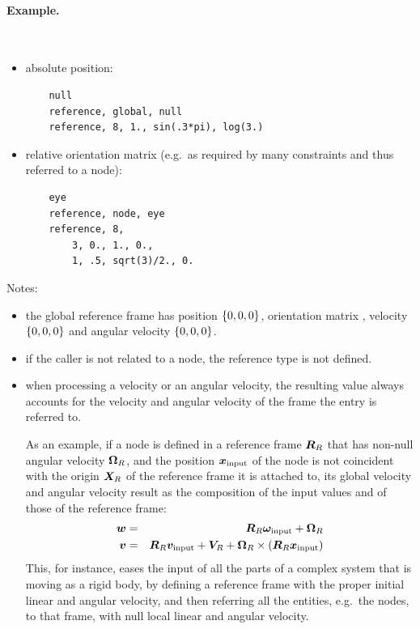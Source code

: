 \paragraph{Example.} \
\begin{itemize}
    \item absolute position:
    \begin{verbatim}
    null
    reference, global, null
    reference, 8, 1., sin(.3*pi), log(3.)
    \end{verbatim}
    \item relative orientation matrix (e.g.\ as required by many constraints and
    thus referred to a node):
    \begin{verbatim}
    eye
    reference, node, eye
    reference, 8,
        3, 0., 1., 0., 
        1, .5, sqrt(3)/2., 0.
    \end{verbatim}
\end{itemize}
Notes: 
\begin{itemize}
    \item the global reference frame has position $ \left\{ 0, 0, 0 \right\} $,
    orientation matrix \kw{eye}, velocity $ \left\{ 0, 0, 0 \right\} $ and angular
    velocity $ \left\{ 0, 0, 0 \right\} $.
    \item if the caller is not related to a node, the reference type
    \kw{node} is not defined. 
    \item when processing a velocity or an angular velocity, the resulting
    value always accounts for the velocity and angular velocity of the frame
    the entry is referred to. 

    As an example, if a node is defined in a reference frame $\boldsymbol{R}_R$
    that has non-null angular velocity $ \boldsymbol{\Omega}_R $, and the position 
    $ \boldsymbol{x}_{\text{input}} $ of the node is not coincident
    with the origin $ \boldsymbol{X}_R $ of the reference frame
    it is attached to, its global velocity and angular velocity result
    as the composition of the input values and of those of the reference 
    frame:
    \begin{eqnarray*}    
        \boldsymbol{w} & = & \boldsymbol{R}_R \boldsymbol{\omega}_{\text{input}} + \boldsymbol{\Omega}_R \\
	\boldsymbol{v} & = & \boldsymbol{R}_R \boldsymbol{v}_{\text{input}} + \boldsymbol{V}_R
		+\boldsymbol{\Omega}_R\times\left( \boldsymbol{R}_R \boldsymbol{x}_{\text{input}} \right)
    \end{eqnarray*}
    This, for instance, eases the input of all the parts of a complex system
    that is moving as a rigid body, by defining a reference frame with the
    proper initial linear and angular velocity, and then referring all the entities, e.g.\ the 
    nodes, to that frame, with null local linear and angular velocity.
\end{itemize}  
